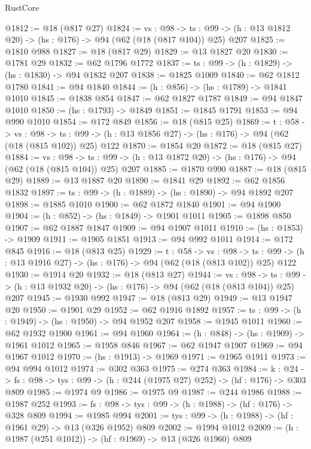 \begin{lexlean}{RustCore}
\begin{coremodule}
@1812 := @18 (@817 @27)
@1824 := {vs : @98} ->
  {ts : @99} -> (h : @13 @1812 @20) -> (hs : @176) -> @94 (@62 (@18 (@817 @104)) @25) @207
@1825 := @1810 @988
@1827 := @18 (@817 @29)
@1829 := @13 @1827 @20
@1830 := @1781 @29
@1832 := @62 @1796 @1772
@1837 := {ts : @99} -> (h : @1829) -> (hs : @1830) -> @94 @1832 @207
@1838 := @1825 @1009
@1840 := @62 @1812 @1780
@1841 := @94 @1840
@1844 := (h : @856) -> (hs : @1789) -> @1841 @1010
@1845 := @1838 @854
@1847 := @62 @1827 @1787
@1849 := @94 @1847 @1010
@1850 := (hs : @1793) -> @1849
@1851 := @1845 @1791
@1853 := @94 @990 @1010
@1854 := @172 @849
@1856 := @18 (@815 @25)
@1869 := {t : @58} ->
  {vs : @98} ->
  {ts : @99} -> (h : @13 @1856 @27) -> (hs : @176) -> @94 (@62 (@18 (@815 @102)) @25) @122
@1870 := @1854 @20
@1872 := @18 (@815 @27)
@1884 := {vs : @98} ->
  {ts : @99} -> (h : @13 @1872 @20) -> (hs : @176) -> @94 (@62 (@18 (@815 @104)) @25) @207
@1885 := @1870 @990
@1887 := @18 (@815 @29)
@1889 := @13 @1887 @20
@1890 := @1841 @29
@1892 := @62 @1856 @1832
@1897 := {ts : @99} -> (h : @1889) -> (hs : @1890) -> @94 @1892 @207
@1898 := @1885 @1010
@1900 := @62 @1872 @1840
@1901 := @94 @1900
@1904 := (h : @852) -> (hs : @1849) -> @1901 @1011
@1905 := @1898 @850
@1907 := @62 @1887 @1847
@1909 := @94 @1907 @1011
@1910 := (hs : @1853) -> @1909
@1911 := @1905 @1851
@1913 := @94 @992 @1011
@1914 := @172 @845
@1916 := @18 (@813 @25)
@1929 := {t : @58} ->
  {vs : @98} ->
  {ts : @99} -> (h : @13 @1916 @27) -> (hs : @176) -> @94 (@62 (@18 (@813 @102)) @25) @122
@1930 := @1914 @20
@1932 := @18 (@813 @27)
@1944 := {vs : @98} ->
  {ts : @99} -> (h : @13 @1932 @20) -> (hs : @176) -> @94 (@62 (@18 (@813 @104)) @25) @207
@1945 := @1930 @992
@1947 := @18 (@813 @29)
@1949 := @13 @1947 @20
@1950 := @1901 @29
@1952 := @62 @1916 @1892
@1957 := {ts : @99} -> (h : @1949) -> (hs : @1950) -> @94 @1952 @207
@1958 := @1945 @1011
@1960 := @62 @1932 @1900
@1961 := @94 @1960
@1964 := (h : @848) -> (hs : @1909) -> @1961 @1012
@1965 := @1958 @846
@1967 := @62 @1947 @1907
@1969 := @94 @1967 @1012
@1970 := (hs : @1913) -> @1969
@1971 := @1965 @1911
@1973 := @94 @994 @1012
@1974 := @302 @363
@1975 := @274 @363
@1984 := {k : @24} ->
  {fs : @98} -> {tys : @99} -> (h : @244 (@1975 @27) @252) -> (hf : @176) -> @303 @809
@1985 := @1974 @9
@1986 := @1975 @9
@1987 := @244 @1986
@1988 := @1987 @252
@1993 := {fs : @98} -> {tys : @99} -> (h : @1988) -> (hf : @176) -> @328 @809
@1994 := @1985 @994
@2001 := {tys : @99} -> (h : @1988) -> (hf : @1961 @29) -> @13 (@326 @1952) @809
@2002 := @1994 @1012
@2009 := (h : @1987 (@251 @1012)) -> (hf : @1969) -> @13 (@326 @1960) @809

\end{coremodule}
\end{lexlean}
